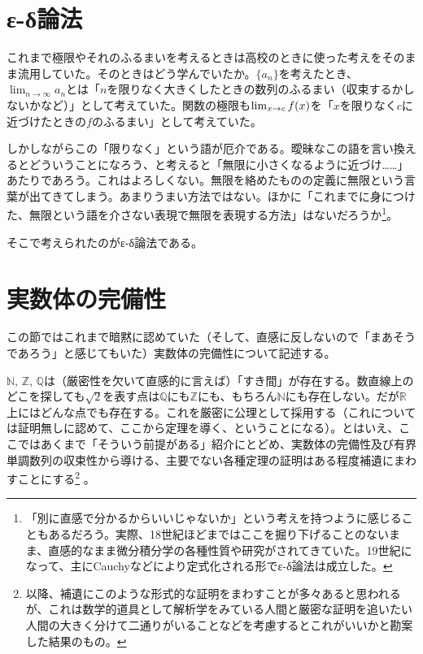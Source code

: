 \clearpage
\section{ε-δ論法}
これまで極限やそれのふるまいを考えるときは高校のときに使った考えをそのまま流用していた。そのときはどう学んでいたか。$\{a_n\}$を考えたとき、$\lim_{n\to\infty}a_n$とは「$n$を限りなく大きくしたときの数列のふるまい（収束するかしないかなど）」として考えていた。関数の極限も$\lim_{x\to c}f\pare{x}$を「$x$を限りなく$c$に近づけたときの$f$のふるまい」として考えていた。

しかしながらこの「限りなく」という語が厄介である。曖昧なこの語を言い換えるとどういうことになろう、と考えると「無限に小さくなるように近づけ……」あたりであろう。これはよろしくない。無限を絡めたものの定義に無限という言葉が出てきてしまう。あまりうまい方法ではない。ほかに「これまでに身につけた、無限という語を介さない表現で無限を表現する方法」はないだろうか\footnote{「別に直感で分かるからいいじゃないか」という考えを持つように感じることもあるだろう。実際、18世紀ほどまではここを掘り下げることのないまま、直感的なまま微分積分学の各種性質や研究がされてきていた。19世紀になって、主にCauchyなどにより定式化される形でε-δ論法は成立した。}。

そこで考えられたのがε-δ論法である。


\clearpage
\section{実数体の完備性}
この節ではこれまで暗黙に認めていた（そして、直感に反しないので「まあそうであろう」と感じてもいた）実数体の完備性について記述する。

$\mathbb{N},\,\mathbb{Z},\,\mathbb{Q}$は（厳密性を欠いて直感的に言えば）「すき間」が存在する。数直線上のどこを探しても$\sqrt{2}$を表す点は$\mathbb{Q}$にも$\mathbb{Z}$にも、もちろん$\mathbb{N}$にも存在しない。だが$\mathbb{R}$上にはどんな点でも存在する。これを厳密に公理として採用する（これについては証明無しに認めて、ここから定理を導く、ということになる）。とはいえ、ここではあくまで「そういう前提がある」紹介にとどめ、実数体の完備性及び有界単調数列の収束性から導ける、主要でない各種定理の証明はある程度補遺にまわすことにする\footnote{以降、補遺にこのような形式的な証明をまわすことが多々あると思われるが、これは数学的道具として解析学をみている人間と厳密な証明を追いたい人間の大きく分けて二通りがいることなどを考慮するとこれがいいかと勘案した結果のもの。} 。